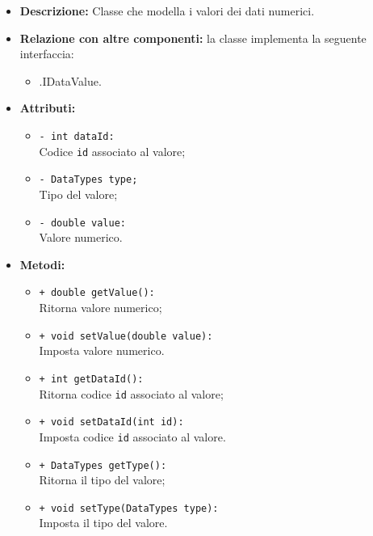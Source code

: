 \begin{flushleft}
\begin{itemize}
\item \textbf{Descrizione:} Classe che modella i valori dei dati numerici.
\item \textbf{Relazione con altre componenti:} la classe implementa la seguente interfaccia:
		\begin{itemize}
			\item \smodel{}.IDataValue.
		\end{itemize}
\item \textbf{Attributi:}
\begin{sloppypar}
\begin{itemize}
\item \texttt{- int dataId:}\\ Codice \texttt{id} associato al valore;
\item \texttt{- DataTypes type;}\\ Tipo del valore;
\item \texttt{- double value:}\\ Valore numerico.
\end{itemize}
\end{sloppypar}
\item \textbf{Metodi:}
\begin{sloppypar}
\begin{itemize}
\item \texttt{+ double getValue():}\\ Ritorna valore numerico;
\item \texttt{+ void setValue(double value):}\\ Imposta valore numerico.
\item \texttt{+ int getDataId():}\\ Ritorna codice \texttt{id} associato al valore;
\item \texttt{+ void setDataId(int id):}\\ Imposta codice \texttt{id} associato al valore.
\item \texttt{+ DataTypes getType():}\\ Ritorna il tipo del valore;
\item \texttt{+ void setType(DataTypes type):}\\ Imposta il tipo del valore.
\end{itemize}
\end{sloppypar}
\end{itemize}
\end{flushleft}


